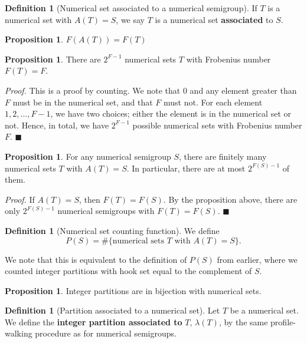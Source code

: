 \documentclass{article}
\theoremstyle{definition}
\theoremstyle{definition}
\newtheorem{defn}[thm]{Definition}
\theoremstyle{definition}
\newtheorem{prop}[thm]{Proposition}
\begin{document}
\begin{defn}[Numerical set associated to a numerical semigroup]
    If $T$ is a numerical set with $A(T) = S$, we say $T$ is a numerical set \textbf{associated} to $S$.
\end{defn}

\begin{prop}
    $F(A(T)) = F(T)$
\end{prop}

\begin{prop}
    There are $2^{F-1}$ numerical sets $T$ with Frobenius number $F(T) = F$.

    \textit{Proof.} This is a proof by counting. We note that $0$ and any element greater than $F$ must be in the numerical set, and that $F$ must not. For each element $1, 2, ..., F-1$, we have two choices; either the element is in the numerical set or not. Hence, in total, we have $2^{F-1}$ possible numerical sets with Frobenius number $F$. $\blacksquare$
\end{prop}

\begin{prop}
    For any numerical semigroup $S$, there are finitely many numerical sets $T$ with $A(T) = S$. In particular, there are at most $2^{F(S)-1}$ of them.

    \textit{Proof.} If $A(T) = S$, then $F(T) = F(S)$. By the proposition above, there are only $2^{F(S)-1}$ numerical semigroups with $F(T) = F(S)$. $\blacksquare$ 
\end{prop}

\begin{defn}[Numerical set counting function]
    We define  
    $$P(S) = \#\{ \text{numerical sets } T \text{ with } A(T) = S\}.$$

    We note that this is equivalent to the definition of $P(S)$ from earlier, where we counted integer partitions with hook set equal to the complement of $S$.  
\end{defn}

\begin{prop}
    Integer partitions are in bijection with numerical sets.
\end{prop}

\begin{defn}[Partition associated to a numerical set]
    Let $T$ be a numerical set. We define the \textbf{integer partition associated to} $T$, $\lambda(T)$, by the same profile-walking procedure as for numerical semigroups.
\end{defn}
\end{document}
